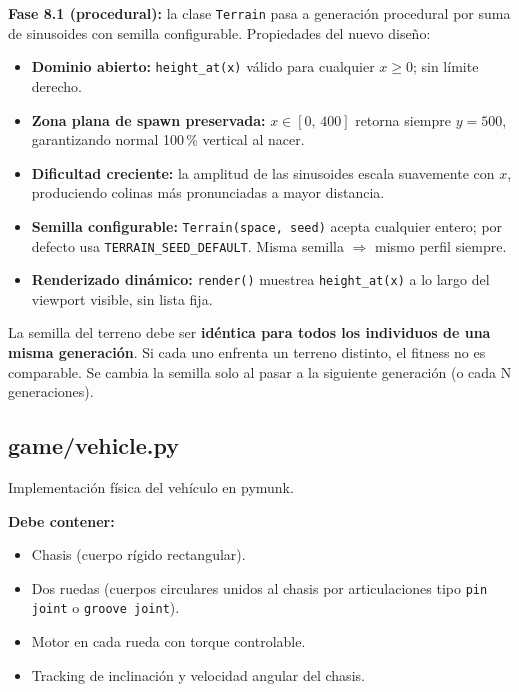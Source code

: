 \documentclass[11pt,a4paper]{article}
\begin{document}
\textbf{Fase 8.1 (procedural):} la clase \texttt{Terrain} pasa a generación
procedural por suma de sinusoides con semilla configurable. Propiedades del nuevo
diseño:
\begin{itemize}
    \item \textbf{Dominio abierto:} \texttt{height\_at(x)} válido para cualquier
          $x \geq 0$; sin límite derecho.
    \item \textbf{Zona plana de spawn preservada:} $x \in [0,\,400]$ retorna
          siempre $y = 500$, garantizando normal 100\,\% vertical al nacer.
    \item \textbf{Dificultad creciente:} la amplitud de las sinusoides escala
          suavemente con $x$, produciendo colinas más pronunciadas a mayor distancia.
    \item \textbf{Semilla configurable:} \texttt{Terrain(space, seed)} acepta
          cualquier entero; por defecto usa \texttt{TERRAIN\_SEED\_DEFAULT}.
          Misma semilla $\Rightarrow$ mismo perfil siempre.
    \item \textbf{Renderizado dinámico:} \texttt{render()} muestrea
          \texttt{height\_at(x)} a lo largo del viewport visible, sin lista fija.
\end{itemize}

\begin{notabox}
La semilla del terreno debe ser \textbf{idéntica para todos los individuos de una misma generación}. Si cada uno enfrenta un terreno distinto, el fitness no es comparable. Se cambia la semilla solo al pasar a la siguiente generación (o cada N generaciones).
\end{notabox}

\subsection{game/vehicle.py}

Implementación física del vehículo en pymunk.

\textbf{Debe contener:}
\begin{itemize}
    \item Chasis (cuerpo rígido rectangular).
    \item Dos ruedas (cuerpos circulares unidos al chasis por articulaciones tipo \texttt{pin joint} o \texttt{groove joint}).
    \item Motor en cada rueda con torque controlable.
    \item Tracking de inclinación y velocidad angular del chasis.
\end{itemize}
\end{document}
